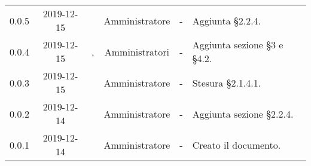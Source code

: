 {\begin{longtable}{ c c  C{2.5cm} c C{3cm} C{3.5cm}}
0.0.5 & 2019-12-15 & \SE{} & Amministratore & - & Aggiunta §2.2.4. \\

0.0.4 & 2019-12-15 & \BR{}, \PF{} & Amministratori & - & Aggiunta sezione §3 e §4.2. \\

0.0.3 & 2019-12-15 & \MC{} & Amministratore & - & Stesura §2.1.4.1. \\

0.0.2 & 2019-12-14 & \CE{} & Amministratore & - & Aggiunta sezione §2.2.4. \\

0.0.1 & 2019-12-14 & \CE{} & Amministratore & - & Creato il documento. \\
		
\end{longtable}
}